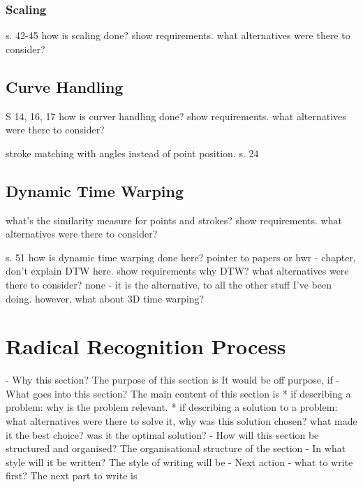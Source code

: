\subsubsection{Scaling}
\label{sec:hwre:scaling}



s. 42-45
how is scaling done?
show requirements.
what alternatives were there to consider?

\subsection{Curve Handling}
\label{sec:hwre:curvehandling}



S 14, 16, 17
how is curver handling done?
show requirements.
what alternatives were there to consider?

stroke matching with angles instead of point position.
s. 24

\subsection{Dynamic Time Warping}
\label{sec:hwre:dynamictimewarping}



what's the similarity measure for
points and strokes?
show requirements.
what alternatives were there to consider?

s. 51
how is dynamic time warping done here?
pointer to papers or hwr - chapter, don't explain DTW here.
show requirements
why DTW?
what alternatives were there to consider?
none - it is the alternative.
to all the other stuff I've been doing.
however, what about 3D time warping?


\section{Radical Recognition Process}
\label{sec:hwre:radicalrecognitionprocess}

- Why this section? 
  The purpose of this section is 
  It would be off purpose, if 
- What goes into this section?
  The main content of this section is 
  * if describing a problem: why is the problem relevant.
  * if describing a solution to a problem: what alternatives were
    there to solve it, why was this solution chosen? 
    what made it the best choice? was it the optimal solution?
- How will this section be structured and organised?
  The organisational structure of the section 
- In what style will it be written?
  The style of writing will be 
- Next action - what to write first?
  The next part to write is


